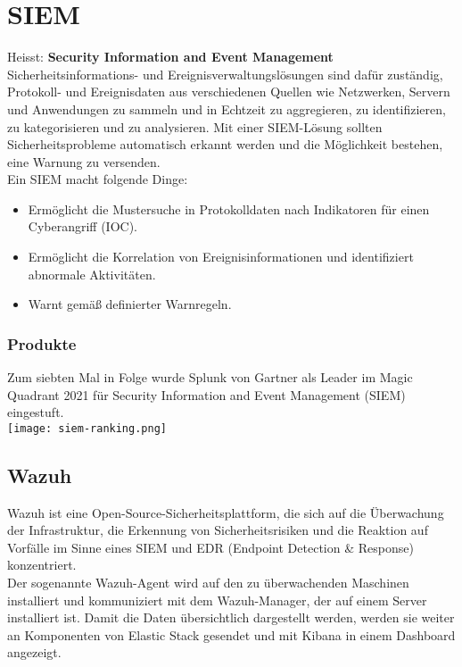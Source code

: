 \section{SIEM}
Heisst: \textbf{Security Information and Event Management}\\

Sicherheitsinformations- und Ereignisverwaltungslösungen sind dafür zuständig, Protokoll- und Ereignisdaten aus verschiedenen Quellen wie Netzwerken, Servern und Anwendungen zu sammeln und in Echtzeit zu aggregieren, zu identifizieren, zu kategorisieren und zu analysieren.
Mit einer SIEM-Lösung sollten Sicherheitsprobleme automatisch erkannt werden und die Möglichkeit bestehen, eine Warnung zu versenden.\\

Ein SIEM macht folgende Dinge:
\begin{itemize}
  \item Ermöglicht die Mustersuche in Protokolldaten nach Indikatoren für einen Cyberangriff (IOC).
  \item Ermöglicht die Korrelation von Ereignisinformationen und identifiziert abnormale Aktivitäten.
  \item Warnt gemäß definierter Warnregeln.
\end{itemize}

\subsubsection{Produkte}
Zum siebten Mal in Folge wurde Splunk von Gartner als Leader im Magic Quadrant 2021 für Security Information and Event Management (SIEM) eingestuft.\\
\texttt{[image: siem-ranking.png]}

\subsection{Wazuh}
Wazuh ist eine Open-Source-Sicherheitsplattform, die sich auf die Überwachung der Infrastruktur, die Erkennung von Sicherheitsrisiken und die Reaktion auf Vorfälle im Sinne eines SIEM und EDR (Endpoint Detection \& Response) konzentriert.\\

Der sogenannte Wazuh-Agent wird auf den zu überwachenden Maschinen installiert und kommuniziert mit dem Wazuh-Manager, der auf einem Server installiert ist.
Damit die Daten übersichtlich dargestellt werden, werden sie weiter an Komponenten von Elastic Stack gesendet und mit Kibana in einem Dashboard angezeigt.

